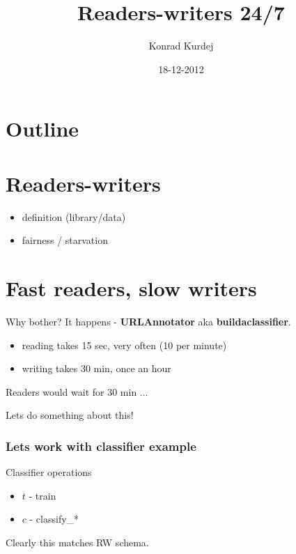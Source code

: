 \documentclass{beamer}
\title{Readers-writers 24/7}
\author{Konrad Kurdej}
\date{18-12-2012}
\begin{document}
\begin{frame}
\titlepage
\end{frame}
\section*{Outline}
\begin{frame}
\tableofcontents
\end{frame}

\section{Readers-writers}
\begin{frame}
\begin{itemize}
 \item definition (library/data)
 \item fairness / starvation
\end{itemize}
\end{frame}


\section{Fast readers, slow writers}

\begin{frame}
\begin{block}{Why bother?}
\pause
It happens - \textbf{URLAnnotator} aka \textbf{buildaclassifier}.
\end{block}

\pause
\begin{example}[]
\begin{itemize}
 \item reading takes 15 sec, very often (10 per minute)
 \item writing takes 30 min, once an hour
\end{itemize}
\end{example}

\pause
Readers would wait for 30 min ...

\pause
\textcolor{dgreen}{Lets do something about this!}

\end{frame}


\begin{frame}
\frametitle{Lets work with classifier example}

\begin{block}{Classifier operations}
\begin{itemize}
 \item $t$ - train
 \item $c$ - classify\_*
\end{itemize}
\end{block}
Clearly this matches RW schema.

\end{frame}
\end{document}
